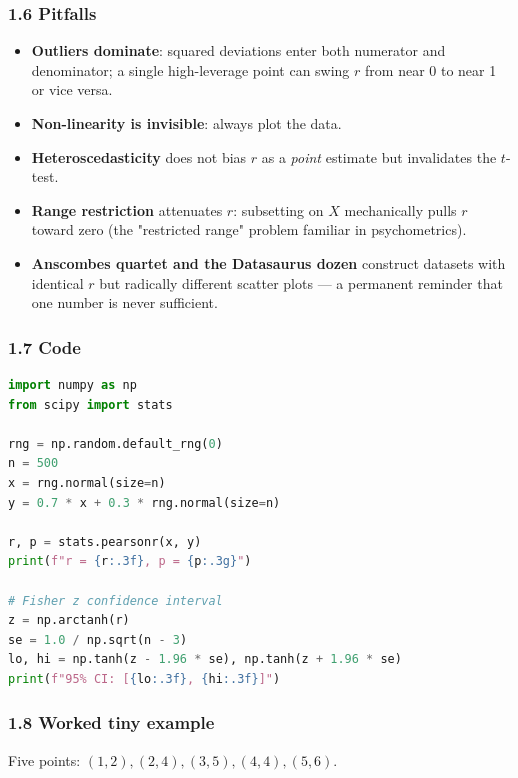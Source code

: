 \documentclass{article}
\providecommand{\tightlist}{\setlength{\itemsep}{0pt}\setlength{\parskip}{0pt}}
\begin{document}
\subsubsection{1.6 Pitfalls}\label{16-pitfalls}

\begin{itemize}
\tightlist
\item
  \textbf{Outliers dominate}: squared deviations enter both numerator
  and denominator; a single high-leverage point can swing \(r\) from
  near 0 to near 1 or vice versa.
\item
  \textbf{Non-linearity is invisible}: always plot the data.
\item
  \textbf{Heteroscedasticity} does not bias \(r\) as a \emph{point}
  estimate but invalidates the \(t\)-test.
\item
  \textbf{Range restriction} attenuates \(r\): subsetting on \(X\)
  mechanically pulls \(r\) toward zero (the "restricted range" problem
  familiar in psychometrics).
\item
  \textbf{Anscombe\textquotesingle s quartet and the Datasaurus dozen}
  construct datasets with identical \(r\) but radically different
  scatter plots --- a permanent reminder that one number is never
  sufficient.
\end{itemize}

\subsubsection{1.7 Code}\label{17-code}

\begin{lstlisting}[language=Python]
import numpy as np
from scipy import stats

rng = np.random.default_rng(0)
n = 500
x = rng.normal(size=n)
y = 0.7 * x + 0.3 * rng.normal(size=n)

r, p = stats.pearsonr(x, y)
print(f"r = {r:.3f}, p = {p:.3g}")

# Fisher z confidence interval
z = np.arctanh(r)
se = 1.0 / np.sqrt(n - 3)
lo, hi = np.tanh(z - 1.96 * se), np.tanh(z + 1.96 * se)
print(f"95% CI: [{lo:.3f}, {hi:.3f}]")
\end{lstlisting}

\subsubsection{1.8 Worked tiny example}\label{18-worked-tiny-example}

Five points: \((1, 2), (2, 4), (3, 5), (4, 4), (5, 6)\).
\end{document}
